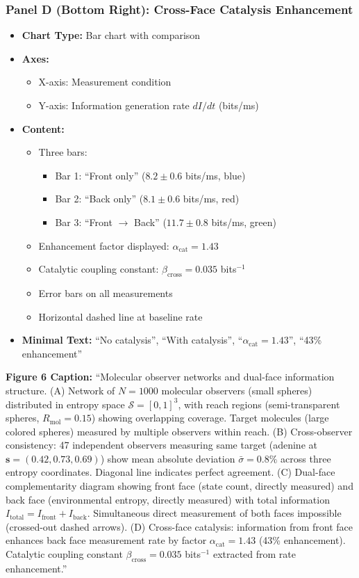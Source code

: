 \subsubsection*{Panel D (Bottom Right): Cross-Face Catalysis Enhancement}
\begin{itemize}
\item \textbf{Chart Type:} Bar chart with comparison
\item \textbf{Axes:}
  \begin{itemize}
  \item X-axis: Measurement condition
  \item Y-axis: Information generation rate $dI/dt$ (bits/ms)
  \end{itemize}
\item \textbf{Content:}
  \begin{itemize}
  \item Three bars:
    \begin{itemize}
    \item Bar 1: ``Front only'' ($8.2 \pm 0.6$ bits/ms, blue)
    \item Bar 2: ``Back only'' ($8.1 \pm 0.6$ bits/ms, red)
    \item Bar 3: ``Front $\to$ Back'' ($11.7 \pm 0.8$ bits/ms, green)
    \end{itemize}
  \item Enhancement factor displayed: $\alpha_{\text{cat}} = 1.43$
  \item Catalytic coupling constant: $\beta_{\text{cross}} = 0.035$ bits$^{-1}$
  \item Error bars on all measurements
  \item Horizontal dashed line at baseline rate
  \end{itemize}
\item \textbf{Minimal Text:} ``No catalysis'', ``With catalysis'', ``$\alpha_{\text{cat}} = 1.43$'', ``43\% enhancement''
\end{itemize}

\textbf{Figure 6 Caption:}
``Molecular observer networks and dual-face information structure. (A) Network of $N=1000$ molecular observers (small spheres) distributed in entropy space $\mathcal{S}=[0,1]^3$, with reach regions (semi-transparent spheres, $R_{\text{mol}}=0.15$) showing overlapping coverage. Target molecules (large colored spheres) measured by multiple observers within reach. (B) Cross-observer consistency: 47 independent observers measuring same target (adenine at $\mathbf{s}=(0.42,0.73,0.69)$) show mean absolute deviation $\bar{\sigma}=0.8\%$ across three entropy coordinates. Diagonal line indicates perfect agreement. (C) Dual-face complementarity diagram showing front face (state count, directly measured) and back face (environmental entropy, directly measured) with total information $I_{\text{total}}=I_{\text{front}}+I_{\text{back}}$. Simultaneous direct measurement of both faces impossible (crossed-out dashed arrows). (D) Cross-face catalysis: information from front face enhances back face measurement rate by factor $\alpha_{\text{cat}}=1.43$ (43\% enhancement). Catalytic coupling constant $\beta_{\text{cross}}=0.035$ bits$^{-1}$ extracted from rate enhancement.''

